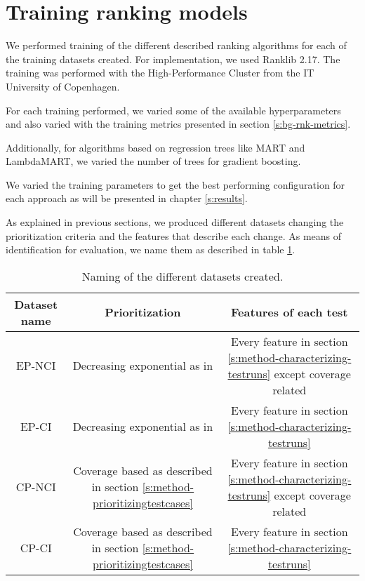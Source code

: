 \section{Training ranking models}\label{s:method-training-models}

We performed training of the different described ranking algorithms for each of the training 
datasets created. For implementation, we used Ranklib 2.17. The training was performed
with the High-Performance Cluster from the IT University of Copenhagen.

For each training performed, we varied some of the available hyperparameters and
also varied with the training metrics presented in section \ref{s:bg-rnk-metrics}. 

Additionally, for algorithms based on regression trees like MART and LambdaMART, we varied
the number of trees for gradient boosting.

We varied the training parameters to get the best performing configuration for each
approach as will be presented in chapter \ref{s:results}.

As explained in previous sections, we produced different datasets changing the prioritization
criteria and the features that describe each change. As means of identification for evaluation, 
we name them as described in table \ref{f:table-naming-datasets}.

\begin{table}[h!]
    \centering
    {\renewcommand{\arraystretch}{2.5}
    \begin{tabular}{|c|c|c|}
        \hline
        \textbf{Dataset name} & \textbf{Prioritization} & \textbf{Features of each test} \\
        \hline
        \parbox{0.12\textwidth}{EP-NCI} & \parbox{0.30\textwidth}{Decreasing exponential as in \cite{Bertolino2020LearningtoRankVR}} & \parbox{0.40\textwidth}{Every feature in section \ref{s:method-characterizing-testruns} except coverage related} \\
        \hline
        \parbox{0.12\textwidth}{EP-CI} & \parbox{0.30\textwidth}{Decreasing exponential as in \cite{Bertolino2020LearningtoRankVR}} & \parbox{0.40\textwidth}{Every feature in section \ref{s:method-characterizing-testruns}} \\
        \hline
        \parbox{0.12\textwidth}{CP-NCI} & \parbox{0.30\textwidth}{Coverage based as described in section \ref{s:method-prioritizingtestcases}} & \parbox{0.40\textwidth}{Every feature in section \ref{s:method-characterizing-testruns} except coverage related} \\
        \hline
        \parbox{0.12\textwidth}{CP-CI} & \parbox{0.30\textwidth}{Coverage based as described in section \ref{s:method-prioritizingtestcases}} & \parbox{0.40\textwidth}{Every feature in section \ref{s:method-characterizing-testruns}} \\
        \hline
    \end{tabular} }
    \caption{Naming of the different datasets created.}
    \label{f:table-naming-datasets}
\end{table}

